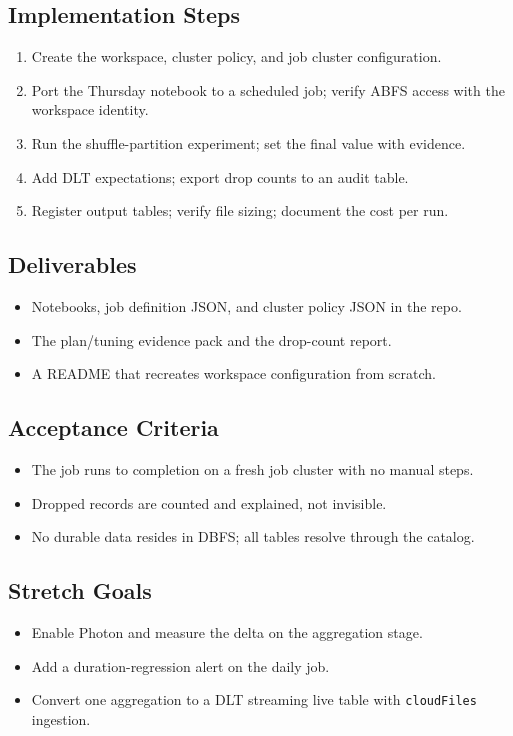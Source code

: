 \subsection*{Implementation Steps}
\begin{enumerate}
    \item Create the workspace, cluster policy, and job cluster configuration.
    \item Port the Thursday notebook to a scheduled job; verify ABFS access with the workspace identity.
    \item Run the shuffle-partition experiment; set the final value with evidence.
    \item Add DLT expectations; export drop counts to an audit table.
    \item Register output tables; verify file sizing; document the cost per run.
\end{enumerate}

\subsection*{Deliverables}
\begin{itemize}
    \item Notebooks, job definition JSON, and cluster policy JSON in the repo.
    \item The plan/tuning evidence pack and the drop-count report.
    \item A README that recreates workspace configuration from scratch.
\end{itemize}

\subsection*{Acceptance Criteria}
\begin{itemize}
    \item The job runs to completion on a fresh job cluster with no manual steps.
    \item Dropped records are counted and explained, not invisible.
    \item No durable data resides in DBFS; all tables resolve through the catalog.
\end{itemize}

\subsection*{Stretch Goals}
\begin{itemize}
    \item Enable Photon and measure the delta on the aggregation stage.
    \item Add a duration-regression alert on the daily job.
    \item Convert one aggregation to a DLT streaming live table with \texttt{cloudFiles} ingestion.
\end{itemize}
